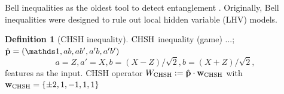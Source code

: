 \documentclass[
reprint,
aps,
pra,
]{revtex4-2}
\theoremstyle{plain}
\theoremstyle{definition}
\newtheorem{definition}{Definition}
\newcommand{\ew}{W}
\newcommand{\chsh}{\textup{CHSH}}
\newcommand{\px}{X}
\newcommand{\pz}{Z}
\begin{document}
Bell inequalities as the oldest tool to detect entanglement \cite{terhalBellInequalitiesSeparability2000}.
Originally, Bell inequalities were designed to rule out local hidden variable (LHV) models.
\begin{definition}[CHSH inequality]\label{def:chsh_inequality}
	$\chsh$ inequality (game) ...; 
	$\hat{\vb{p}}=\qty(\identity, a b, a b', a' b, a' b' )$
	\begin{equation}
		a = \pz, a' = \px, 
		b = (\px-\pz)/\sqrt{2},
		b = (\px+\pz)/\sqrt{2},
		\label{eq:chsh}
	\end{equation}
	features as the input.
	CHSH operator $\ew_{\chsh}:=\hat{\vb{p}}\cdot\vb{w}_{\chsh}$ with 
	$\vb{w}_{\chsh} = \qty{\pm 2, 1, -1, 1, 1}$
\end{definition}
\end{document}
